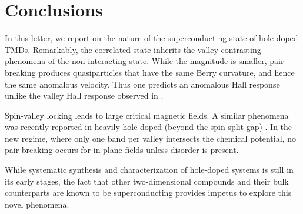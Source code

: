 \section{Conclusions}

In this letter, we report on the nature of the superconducting state
of hole-doped TMDs.
Remarkably, the correlated state inherits
the valley contrasting phenomena of the non-interacting state.
While the magnitude is smaller, pair-breaking produces quasiparticles
that have the same Berry curvature, and hence the same anomalous velocity.
Thus one predicts an anomalous Hall response unlike the valley Hall response
observed in .

Spin-valley locking leads to large critical magnetic fields.
A similar phenomena was recently reported in heavily hole-doped
(beyond the spin-split gap) 
\cite{%
  1510.06289v2,%
  PhysRevLett.113.097001%
}.
In the new regime, where only one band per valley intersects
the chemical potential, no pair-breaking occurs
for in-plane fields unless disorder is present.

While systematic synthesis and characterization of hole-doped systems
is still in its early stages, the fact that other two-dimensional compounds
and their bulk counterparts are known to be superconducting
\cite{%
  PhysRevB.88.054515%
}
provides impetus to explore this novel phenomena.
